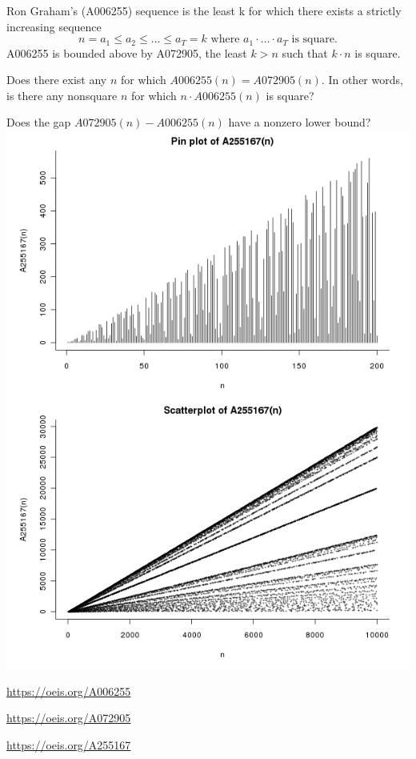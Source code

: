 \documentclass{article}
\begin{document}
  Ron Graham's (A006255) sequence is the least k for which there exists a
  strictly increasing sequence \[
    n = a_1 \leq a_2 \leq \hdots \leq a_T = k \text{ where }
    a_1 \cdot\hdots\cdot a_T \text{ is square.}
  \]
  A006255 is bounded above by A072905, the least $k > n$ such that $k\cdot n$
  is square.

\begin{question}
  Does there exist any $n$ for which $A006255(n) = A072905(n)$. In other words,
  is there any nonsquare $n$ for which $n \cdot A006255(n)$ is square?
\end{question}

\begin{related}
  \item Does the gap $A072905(n) - A006255(n)$ have a nonzero lower bound?\\
    \includegraphics[trim={0cm 0 0 14cm},clip,scale=0.7]{assets/018_problem_A255167}
\end{related}

\begin{references}
  \item \url{https://oeis.org/A006255}
  \item \url{https://oeis.org/A072905}
  \item \url{https://oeis.org/A255167}
\end{references}
\end{document}
